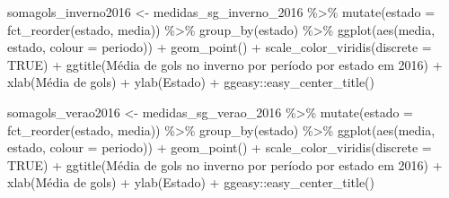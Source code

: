\documentclass[
]{article}
\newenvironment{Shaded}{\begin{snugshade}}{\end{snugshade}}
\newcommand{\AttributeTok}[1]{\textcolor[rgb]{0.77,0.63,0.00}{#1}}
\newcommand{\ConstantTok}[1]{\textcolor[rgb]{0.00,0.00,0.00}{#1}}
\newcommand{\FunctionTok}[1]{\textcolor[rgb]{0.00,0.00,0.00}{#1}}
\newcommand{\NormalTok}[1]{#1}
\newcommand{\OtherTok}[1]{\textcolor[rgb]{0.56,0.35,0.01}{#1}}
\newcommand{\SpecialCharTok}[1]{\textcolor[rgb]{0.00,0.00,0.00}{#1}}
\newcommand{\StringTok}[1]{\textcolor[rgb]{0.31,0.60,0.02}{#1}}
\begin{document}
\begin{Shaded}
\begin{Highlighting}[]
\NormalTok{somagols\_inverno2016 }\OtherTok{\textless{}{-}}\NormalTok{ medidas\_sg\_inverno\_2016 }\SpecialCharTok{\%\textgreater{}\%} \FunctionTok{mutate}\NormalTok{(}\AttributeTok{estado =} \FunctionTok{fct\_reorder}\NormalTok{(estado, media)) }\SpecialCharTok{\%\textgreater{}\%} 
  \FunctionTok{group\_by}\NormalTok{(estado) }\SpecialCharTok{\%\textgreater{}\%}
  \FunctionTok{ggplot}\NormalTok{(}\FunctionTok{aes}\NormalTok{(media, estado, }\AttributeTok{colour =}\NormalTok{ periodo)) }\SpecialCharTok{+} \FunctionTok{geom\_point}\NormalTok{() }\SpecialCharTok{+}
  \FunctionTok{scale\_color\_viridis}\NormalTok{(}\AttributeTok{discrete =} \ConstantTok{TRUE}\NormalTok{) }\SpecialCharTok{+}
  \FunctionTok{ggtitle}\NormalTok{(}\StringTok{\textquotesingle{}Média de gols no inverno por período por estado em 2016\textquotesingle{}}\NormalTok{) }\SpecialCharTok{+} 
  \FunctionTok{xlab}\NormalTok{(}\StringTok{\textquotesingle{}Média de gols\textquotesingle{}}\NormalTok{) }\SpecialCharTok{+} \FunctionTok{ylab}\NormalTok{(}\StringTok{\textquotesingle{}Estado\textquotesingle{}}\NormalTok{) }\SpecialCharTok{+}
\NormalTok{  ggeasy}\SpecialCharTok{::}\FunctionTok{easy\_center\_title}\NormalTok{() }

\NormalTok{somagols\_verao2016 }\OtherTok{\textless{}{-}}\NormalTok{ medidas\_sg\_verao\_2016 }\SpecialCharTok{\%\textgreater{}\%} \FunctionTok{mutate}\NormalTok{(}\AttributeTok{estado =} \FunctionTok{fct\_reorder}\NormalTok{(estado, media)) }\SpecialCharTok{\%\textgreater{}\%} 
  \FunctionTok{group\_by}\NormalTok{(estado) }\SpecialCharTok{\%\textgreater{}\%}
  \FunctionTok{ggplot}\NormalTok{(}\FunctionTok{aes}\NormalTok{(media, estado, }\AttributeTok{colour =}\NormalTok{ periodo)) }\SpecialCharTok{+} \FunctionTok{geom\_point}\NormalTok{() }\SpecialCharTok{+}
  \FunctionTok{scale\_color\_viridis}\NormalTok{(}\AttributeTok{discrete =} \ConstantTok{TRUE}\NormalTok{) }\SpecialCharTok{+}
  \FunctionTok{ggtitle}\NormalTok{(}\StringTok{\textquotesingle{}Média de gols no inverno por período por estado em 2016\textquotesingle{}}\NormalTok{) }\SpecialCharTok{+} 
  \FunctionTok{xlab}\NormalTok{(}\StringTok{\textquotesingle{}Média de gols\textquotesingle{}}\NormalTok{) }\SpecialCharTok{+} \FunctionTok{ylab}\NormalTok{(}\StringTok{\textquotesingle{}Estado\textquotesingle{}}\NormalTok{) }\SpecialCharTok{+}
\NormalTok{  ggeasy}\SpecialCharTok{::}\FunctionTok{easy\_center\_title}\NormalTok{() }



\end{Highlighting}
\end{Shaded}
\end{document}
